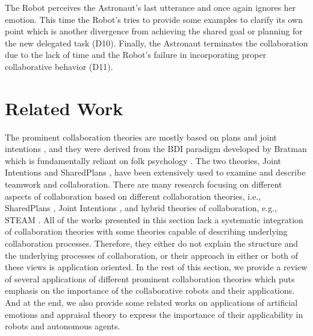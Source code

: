 The Robot perceives the Astronaut's last utterance and once again ignores her
emotion. This time the Robot's tries to provide some examples to clarify its own
point which is another divergence from achieving the shared goal or planning for
the new delegated task (D10). Finally, the Astronaut terminates the
collaboration due to the lack of time and the Robot's failure in incorporating
proper collaborative behavior (D11).\\

\noindent{}

\section{Related Work}
\label{sec:related-work}

The prominent collaboration theories are mostly based on plans and joint
intentions
\cite{cohen:teamwork,grosz:plans-discourse,Litman:discourse-commonsense}, and
they were derived from the BDI paradigm developed by Bratman
\cite{bratman:intentions-plans} which is fundamentally reliant on folk
psychology \cite{ravenscroft:folk}. The two theories, Joint Intentions
\cite{cohen:teamwork} and SharedPlans \cite{grosz:plans-discourse}, have been
extensively used to examine and describe teamwork and collaboration. There are
many research focusing on different aspects of collaboration based on different
collaboration theories, i.e., SharedPlans
\cite{grosz:planning-acting,grosz:collaboration,grosz:plans-discourse}, Joint
Intentions \cite{cohen:teamwork}, and hybrid theories of collaboration, e.g.,
STEAM \cite{tambe:flexible-teamwork}. All of the works presented in this section
lack a systematic integration of collaboration theories with some theories
capable of describing underlying collaboration processes. Therefore, they
either do not explain the structure and the underlying processes of
collaboration, or their approach in either or both of these views is application
oriented. In the rest of this section, we provide a review of several
applications of different prominent collaboration theories which puts emphasis
on the importance of the collaborative robots and their applications. And at the
end, we also provide some related works on applications of artificial emotions
and appraisal theory to express the importance of their applicability in robots
and autonomous agents.

